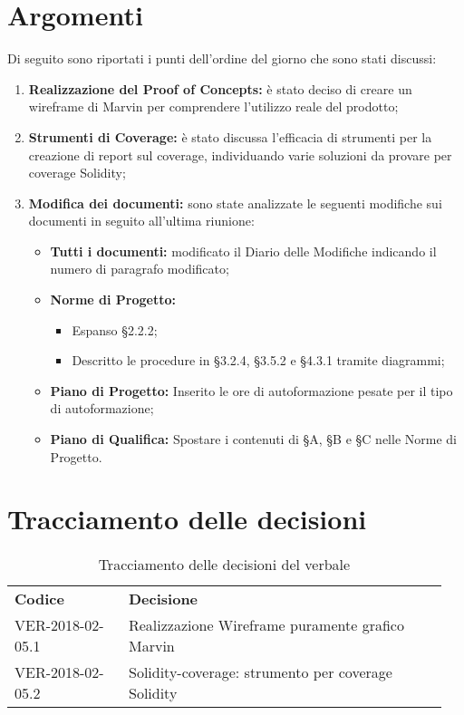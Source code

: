 \documentclass[VER-2018-05-02.tex]{subfiles}
\begin{document}
\section{Argomenti}
Di seguito sono riportati i punti dell'ordine del giorno che sono stati discussi:
\begin{enumerate}
	\item \textbf{Realizzazione del Proof of Concepts:} è stato deciso di creare un wireframe di Marvin per comprendere l'utilizzo reale del prodotto;
	\item \textbf{Strumenti di Coverage:} è stato discussa l'efficacia di strumenti per la creazione di report sul coverage, individuando varie soluzioni da provare per coverage Solidity;	
	\item \textbf{Modifica dei documenti:} sono state analizzate le seguenti modifiche sui documenti in seguito all'ultima riunione:
	\begin{itemize}
		\item \textbf{Tutti i documenti:} modificato il Diario delle Modifiche indicando il numero di paragrafo modificato;
		\item \textbf{Norme di Progetto:} \begin{itemize}
										     \item Espanso \S 2.2.2;
										     \item Descritto le procedure in \S 3.2.4, \S 3.5.2 e \S 4.3.1 tramite diagrammi;
								           \end{itemize}
      \item \textbf{Piano di Progetto:} Inserito le ore di autoformazione pesate per il tipo di autoformazione;
      \item\textbf{Piano di Qualifica:} Spostare i contenuti di \S A, \S B e \S C nelle Norme di Progetto.
	\end{itemize}
\end{enumerate}

\section{Tracciamento delle decisioni}
\begin{table}[H]
	\begin{center}
		\begin{tabu} to 
			\tableHeaderStyle
			\textbf{Codice} & \textbf{Decisione} \\
			VER-2018-02-05.1 & Realizzazione Wireframe puramente grafico Marvin \\
			VER-2018-02-05.2 & Solidity-coverage: strumento per coverage Solidity \\
		\end{tabu}
		\caption{Tracciamento delle decisioni del verbale}
	\end{center}
\end{table}
\end{document}
